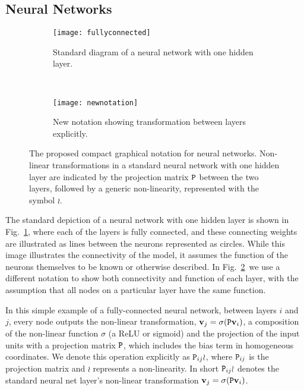 \documentclass[thesis]{subfiles}
\begin{document}
	\subsection{Neural Networks}
	\begin{figure}[tbp] 
		\centering
		\begin{subfigure}[b]{0.45\textwidth}
			\centering
			\texttt{[image: fullyconnected]}
			\caption{Standard diagram of a neural network with one hidden layer.}
			\label{fig:oldnotation}
		\end{subfigure}
		~
		\begin{subfigure}[b]{0.45\textwidth}
			\centering
			\texttt{[image: newnotation]}
			\caption{New notation showing transformation between layers explicitly.}
			\label{fig:newnotation}
		\end{subfigure}
		\caption[New graphical notation for a standard neural network with one hidden layer.]{The proposed compact graphical notation for neural networks. Non-linear transformations in a standard neural network with one hidden layer are indicated by the projection matrix $\mat P$ between the two layers, followed by a generic non-linearity, represented with the symbol $\wr$.}
		\label{fig:newGraphLanguage}
	\end{figure}
	
	The standard depiction of a neural network with one hidden layer is shown in Fig.~\ref{fig:oldnotation}, where each of the layers is fully connected, and these connecting weights are illustrated as lines between the neurons represented as circles. While this image illustrates the connectivity of the model, it assumes the function of the neurons themselves to be known or otherwise described. In Fig.~\ref{fig:newnotation}\ we use a different notation to show both connectivity and function of each layer, with the assumption that all nodes on a particular layer have the same function.
	
	In this simple example of a fully-connected neural network, between layers $i$ and $j$, every node outputs the non-linear transformation, $\vec v_j = \sigma(\mat P \vec v_i)$, a composition of the non-linear function $\sigma$ (\eg a ReLU or sigmoid) and the projection of the input units with a projection matrix $\mat P$, which includes the bias term in homogeneous coordinates. We denote this operation explicitly as $\mat P_{ij} \wr$, where $\mat P_{ij}$ is the projection matrix and $\wr$ represents a non-linearity. In short $\mat P_{ij} \wr$ denotes the standard neural net layer's non-linear transformation $\vec v_j = \sigma(\mat P \vec v_i)$. 
	
\end{document}
